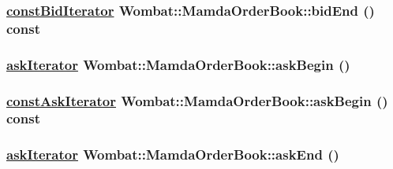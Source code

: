 \hypertarget{classWombat_1_1MamdaOrderBook_706f1e3cfffd890176683bca10584d16}{
\subsubsection[bidEnd]{\setlength{\rightskip}{0pt plus 5cm}\hyperlink{classWombat_1_1MamdaOrderBook_1_1bidIterator}{const\-Bid\-Iterator} Wombat::Mamda\-Order\-Book::bid\-End () const}}
\label{classWombat_1_1MamdaOrderBook_706f1e3cfffd890176683bca10584d16}


\hypertarget{classWombat_1_1MamdaOrderBook_9035064d41049efafb1be14de7901fa1}{
\subsubsection[askBegin]{\setlength{\rightskip}{0pt plus 5cm}\hyperlink{classWombat_1_1MamdaOrderBook_1_1askIterator}{ask\-Iterator} Wombat::Mamda\-Order\-Book::ask\-Begin ()}}
\label{classWombat_1_1MamdaOrderBook_9035064d41049efafb1be14de7901fa1}


\hypertarget{classWombat_1_1MamdaOrderBook_528eba86f58b3e4c3fd135a775f69ff3}{
\subsubsection[askBegin]{\setlength{\rightskip}{0pt plus 5cm}\hyperlink{classWombat_1_1MamdaOrderBook_1_1askIterator}{const\-Ask\-Iterator} Wombat::Mamda\-Order\-Book::ask\-Begin () const}}
\label{classWombat_1_1MamdaOrderBook_528eba86f58b3e4c3fd135a775f69ff3}


\hypertarget{classWombat_1_1MamdaOrderBook_e39211f1e853b8e0de3dc827fd2d19c9}{
\subsubsection[askEnd]{\setlength{\rightskip}{0pt plus 5cm}\hyperlink{classWombat_1_1MamdaOrderBook_1_1askIterator}{ask\-Iterator} Wombat::Mamda\-Order\-Book::ask\-End ()}}
\label{classWombat_1_1MamdaOrderBook_e39211f1e853b8e0de3dc827fd2d19c9}


